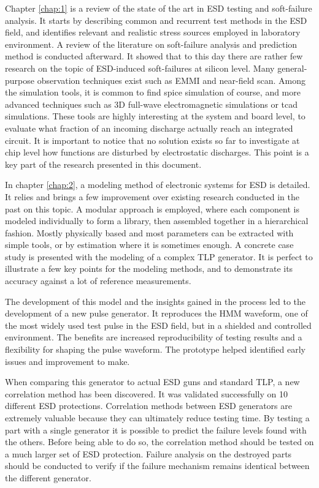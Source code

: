 Chapter \ref{chap:1} is a review of the state of the art in ESD testing and soft-failure analysis.
It starts by describing common and recurrent test methods in the ESD field, and identifies relevant and realistic stress sources employed in laboratory environment.
A review of the literature on soft-failure analysis and prediction method is conducted afterward.
It showed that to this day there are rather few research on the topic of ESD-induced soft-failures at silicon level.
Many general-purpose observation techniques exist such as EMMI and near-field scan.
Among the simulation tools, it is common to find \gls{spice} simulation of course, and more advanced techniques such as 3D full-wave electromagnetic simulations or \gls{tcad} simulations.
These tools are highly interesting at the system and board level, to evaluate what fraction of an incoming discharge actually reach an integrated circuit.
It is important to notice that no solution exists so far to investigate at chip level how functions are disturbed by electrostatic discharges.
This point is a key part of the research presented in this document.

In chapter \ref{chap:2}, a modeling method of electronic systems for ESD is detailed.
It relies and brings a few improvement over existing research conducted in the past on this topic.
A modular approach is employed, where each component is modeled individually to form a library, then assembled together in a hierarchical fashion.
Mostly physically based and most parameters can be extracted with simple tools, or by estimation where it is sometimes enough.
A concrete case study is presented with the modeling of a complex TLP generator.
It is perfect to illustrate a few key points for the modeling methods, and to demonstrate its accuracy against a lot of reference measurements.

The development of this model and the insights gained in the process led to the development of a new pulse generator.
It reproduces the HMM waveform, one of the most widely used test pulse in the ESD field, but in a shielded and controlled environment.
The benefits are increased reproducibility of testing results and a flexibility for shaping the pulse waveform.
The prototype helped identified early issues and improvement to make.

When comparing this generator to actual ESD guns and standard TLP, a new correlation method has been discovered.
It was validated successfully on 10 different ESD protections.
Correlation methods between ESD generators are extremely valuable because they can ultimately reduce testing time.
By testing a part with a single generator it is possible to predict the failure levels found with the others.
Before being able to do so, the correlation method should be tested on a much larger set of ESD protection.
Failure analysis on the destroyed parts should be conducted to verify if the failure mechanism remains identical between the different generator.

